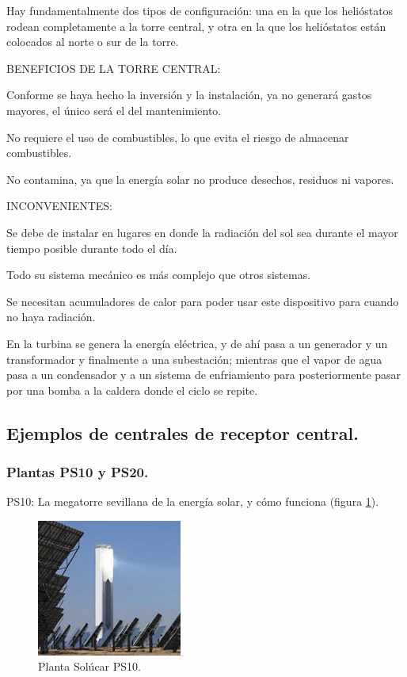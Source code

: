 Hay fundamentalmente dos tipos de configuración: una en la que los helióstatos rodean completamente a la torre central, y otra en la que los helióstatos están colocados al norte o sur de la torre.

BENEFICIOS DE LA TORRE CENTRAL:

Conforme se haya hecho la inversión y la instalación, ya no generará gastos mayores, el único será el del mantenimiento.

No requiere el uso de combustibles, lo que evita el riesgo de almacenar combustibles.

No contamina, ya que la energía solar no produce desechos, residuos ni vapores.

INCONVENIENTES:

Se debe de instalar en lugares en donde la radiación del sol sea durante el mayor tiempo posible durante todo el día.

Todo su sistema mecánico es más complejo que otros sistemas.

Se necesitan acumuladores de calor para poder usar este dispositivo para cuando no haya radiación.

En la turbina se genera la energía eléctrica, y de ahí pasa a un generador y un transformador y finalmente a una subestación; mientras que el vapor de agua pasa a un condensador y a un sistema de enfriamiento para posteriormente pasar por una bomba a la caldera donde el ciclo se repite. \cite{IgualadaWebSite} \cite{SoliclimaWebSite} \cite{ClaudioWebSite}

\subsection{Ejemplos de centrales de receptor central.}
\subsubsection{Plantas PS10 y PS20.}

PS10: La megatorre sevillana de la energía solar, y cómo funciona (figura \ref{fig:FotosPaginasWebHeliostatos/unnamed(4).jpg}).

\begin{figure}[h!]
  	\centering
	\includegraphics[scale=1]{FotosPaginasWebHeliostatos/unnamed(4).jpg}
	\caption{Planta Solúcar PS10.
	\label{fig:FotosPaginasWebHeliostatos/unnamed(4).jpg}}
\end{figure}


